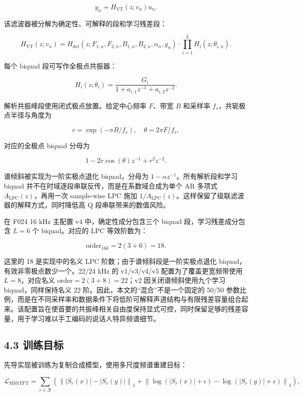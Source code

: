 \[
y_n = H_{\mathrm{VT}}(z; v_n) u_n.
\]

该滤波器被分解为确定性、可解释的段和学习残差段：

\[
H_{\mathrm{VT}}(z; v_n)
=
H_{\mathrm{det}}(z; F_{1,n}, F_{2,n}, B_{1,n}, B_{2,n}, \alpha_n, g_n)
\cdot
\prod_{i=1}^{L} H_i(z; \theta_{i,n}).
\]

每个 biquad 段可写作全极点共振器：

\[
H_i(z; \theta_i)
=
\frac{G_i}{1+a_{i,1}z^{-1}+a_{i,2}z^{-2}}.
\]

解析共振峰段使用闭式极点放置。给定中心频率 \(F\)、带宽 \(B\) 和采样率
\(f_s\)，共轭极点半径与角度为

\[
r=\exp(-\pi B/f_s),
\quad
\theta=2\pi F/f_s,
\]

对应的全极点 biquad 分母为

\[
1-2r\cos(\theta)z^{-1}+r^2z^{-2}.
\]

谱倾斜被实现为一阶实极点退化 biquad，分母为
\(1-\alpha z^{-1}\)。所有解析段和学习 biquad
并不在时域逐段串联反传，而是在系数域合成为单个 AR 多项式
\(A_{\mathrm{LPC}}(z)\)，再用一次 sample-wise LPC 施加
\(1/A_{\mathrm{LPC}}(z)\)。这样保留了级联滤波器的解释方式，同时降低高 Q
段串联带来的数值风险。

在 F024 16 kHz 主配置 v4 中，确定性成分包含三个 biquad
段，学习残差成分包含 \(L=6\) 个 biquad。对应的 LPC 等效阶数为：

\[
\mathrm{order}_{16k} = 2(3+6)=18.
\]

这里的 18 是实现中的名义 LPC 阶数；由于谱倾斜段是一阶实极点退化
biquad，有效非零极点数少一个。22/24 kHz 的 v1/v3/v4/v5
配置为了覆盖更宽频带使用 \(L=8\)，对应名义
\(\mathrm{order}=2(3+8)=22\)；v2 因关闭谱倾斜使用九个学习
biquad，同样保持名义 22 阶。因此，本文的``混合''不是一个固定的 50/50
参数比例，而是在不同采样率和数据条件下将低阶可解释声道结构与有限残差容量组合起来。该配置旨在使首要的共振峰相关自由度保持显式可控，同时保留足够的残差容量，用于学习难以手工编码的说话人特异频谱细节。

\subsection{4.3 训练目标}\label{ux8badux7ec3ux76eeux6807}

先导实现被训练为复制合成模型，使用多尺度频谱重建目标：

\[
\mathcal{L}_{\mathrm{MSSTFT}}
=
\sum_{r\in\mathcal{R}}
\left(
\left\| |S_r(x)|-|S_r(y)| \right\|_1
+
\left\| \log(|S_r(x)|+\epsilon)-\log(|S_r(y)|+\epsilon) \right\|_1
\right),
\]

